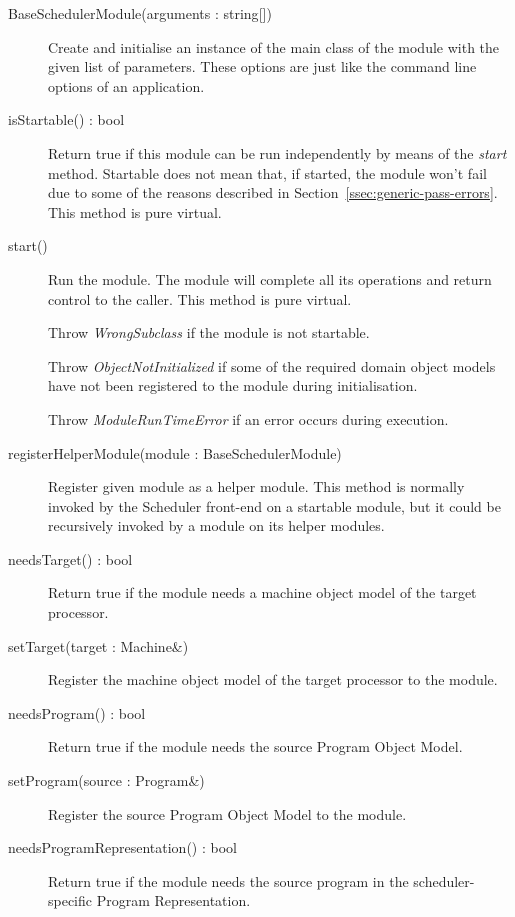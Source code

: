 \documentclass[a4paper,twoside]{tce}
\begin{document}
\begin{description}

\item[BaseSchedulerModule(arguments : string{[]})]%
  Create and initialise an instance of the main class of the module with the
  given list of parameters. These options are just like the command line
  options of an application.

\item[isStartable() : bool]
  Return true if this module can be run independently by means of the
  \emph{start} method. Startable does not mean that, if started, the module
  won't fail due to some of the reasons described in
  Section~\ref{ssec:generic-pass-errors}. This method is pure virtual.

\item[start()]
  Run the module. The module will complete all its operations and return
  control to the caller. This method is pure virtual.

  Throw \emph{WrongSubclass} if the module is not startable.

  Throw \emph{ObjectNotInitialized} if some of the required domain
  object models have not been registered to the module during
  initialisation.

  Throw \emph{ModuleRunTimeError} if an error occurs during execution.

\item[registerHelperModule(module : BaseSchedulerModule)]
  Register given module as a helper module. This method is normally invoked
  by the Scheduler front-end on a startable module, but it could be
  recursively invoked by a module on its helper modules.

\item[needsTarget() : bool]
  Return true if the module needs a machine object model of the target
  processor.

\item[setTarget(target : Machine\&)]
  Register the machine object model of the target processor to the module.

\item[needsProgram() : bool]
  Return true if the module needs the source Program Object Model.

\item[setProgram(source : Program\&)]
  Register the source Program Object Model to the module.

\item[needsProgramRepresentation() : bool]
  Return true if the module needs the source program in the
  scheduler-specific Program Representation.


\end{description}
\end{document}
